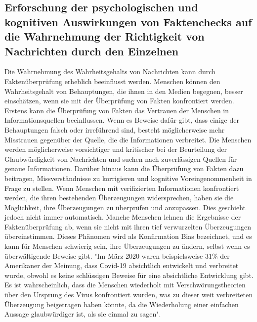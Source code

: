 \documentclass[a4paper,listof=totoc,bibliography=totoc]{scrartcl}
\begin{document}
\subsection{Erforschung der psychologischen und kognitiven Auswirkungen von Faktenchecks auf die Wahrnehmung der Richtigkeit von Nachrichten durch den Einzelnen} 
Die Wahrnehmung des Wahrheitsgehalts von Nachrichten kann durch Faktenüberprüfung erheblich beeinflusst werden. Menschen können den Wahrheitsgehalt von Behauptungen, die 
ihnen in den Medien begegnen, besser einschätzen, wenn sie mit der Überprüfung von Fakten konfrontiert werden. Erstens kann die Überprüfung von Fakten das Vertrauen der 
Menschen in Informationsquellen beeinflussen. Wenn es Beweise dafür gibt, dass einige der Behauptungen falsch oder irreführend sind, besteht möglicherweise mehr Misstrauen 
gegenüber der Quelle, die die Informationen verbreitet. Die Menschen werden möglicherweise vorsichtiger und kritischer bei der Beurteilung der Glaubwürdigkeit von Nachrichten 
und suchen nach zuverlässigen Quellen für genaue Informationen. Darüber hinaus kann die Überprüfung von Fakten dazu beitragen, Missverständnisse zu korrigieren und kognitive 
Voreingenommenheit in Frage zu stellen. Wenn Menschen mit verifizierten Informationen konfrontiert werden, die ihren bestehenden Überzeugungen widersprechen, haben sie die 
Möglichkeit, ihre Überzeugungen zu überprüfen und anzupassen. Dies geschieht jedoch nicht immer automatisch. Manche Menschen lehnen die Ergebnisse der Faktenüberprüfung ab, 
wenn sie nicht mit ihren tief verwurzelten Überzeugungen übereinstimmen. Dieses Phänomen wird als Konfirmation Bias bezeichnet, und es kann für Menschen schwierig sein, ihre 
Überzeugungen zu ändern, selbst wenn es überwältigende Beweise gibt. "Im März 2020 waren beispielsweise 31\% der Amerikaner der Meinung, dass Covid-19 absichtlich entwickelt 
und verbreitet wurde, obwohl es keine schlüssigen Beweise für eine absichtliche Entwicklung gibt. Es ist wahrscheinlich, dass die Menschen wiederholt mit Verschwörungstheorien 
über den Ursprung des Virus konfrontiert wurden, was zu dieser weit verbreiteten Überzeugung beigetragen haben könnte, da die Wiederholung einer einfachen Aussage glaubwürdiger 
ist, als sie einmal zu sagen"\cite{K.H.Ecker:2022}.\newline
\end{document}
